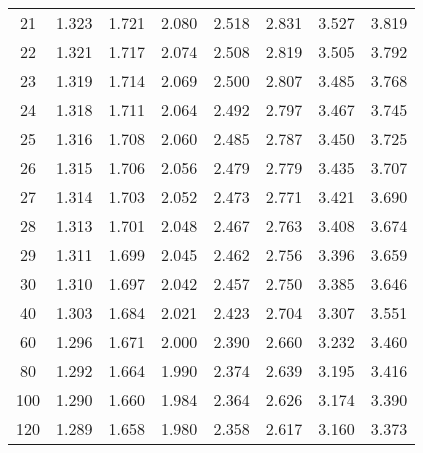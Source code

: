 \begin{tabular}{|c|r|r|r|r|r|r|r|}
 21&  1.323&  1.721&  2.080&  2.518&  2.831&  3.527&  3.819\\
 22&  1.321&  1.717&  2.074&  2.508&  2.819&  3.505&  3.792\\
 23&  1.319&  1.714&  2.069&  2.500&  2.807&  3.485&  3.768\\
 24&  1.318&  1.711&  2.064&  2.492&  2.797&  3.467&  3.745\\
 25&  1.316&  1.708&  2.060&  2.485&  2.787&  3.450&  3.725\\
 26&  1.315&  1.706&  2.056&  2.479&  2.779&  3.435&  3.707\\
 27&  1.314&  1.703&  2.052&  2.473&  2.771&  3.421&  3.690\\
 28&  1.313&  1.701&  2.048&  2.467&  2.763&  3.408&  3.674\\
 29&  1.311&  1.699&  2.045&  2.462&  2.756&  3.396&  3.659\\
 30&  1.310&  1.697&  2.042&  2.457&  2.750&  3.385&  3.646\\
 40&  1.303&  1.684&  2.021&  2.423&  2.704&  3.307&  3.551\\
 60&  1.296&  1.671&  2.000&  2.390&  2.660&  3.232&  3.460\\
 80&  1.292&  1.664&  1.990&  2.374&  2.639&  3.195&  3.416\\
100&  1.290&  1.660&  1.984&  2.364&  2.626&  3.174&  3.390\\
120&  1.289&  1.658&  1.980&  2.358&  2.617&  3.160&  3.373\\
\hline
\end{tabular}

\myskip
